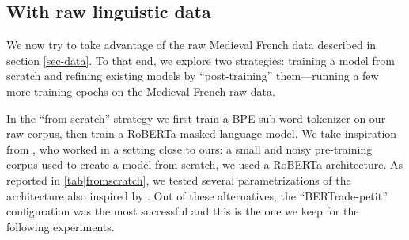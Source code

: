 \subsection{With raw linguistic data}\label{sec|withraw}

\begin{table}[ht]
    \centering
    \tablefontsize
    \caption{Results on SRCMF dev — Performances of different model sizes when training from scratch}\label{tab|fromscratch}
\end{table}

We now try to take advantage of the raw Medieval French data described in section \ref{sec-data}. To that end, we explore two strategies: training a model from scratch and refining existing models by \enquote{post-training} them---running a few more training epochs on the Medieval French raw data.

In the \enquote{from scratch} strategy we first train a BPE sub-word tokenizer \citep{wang-cho-etal-2020-neural} on our raw corpus, then train a RoBERTa \citep{liu-etal-2019-roberta} masked language model. We take inspiration from \citet{micheli-etal-2020-importance}, who worked in a setting close to ours: a small and noisy pre-training corpus used to create a model from scratch, we used a RoBERTa architecture. As reported in \cref{tab|fromscratch}, we tested several parametrizations of the architecture also inspired by \citet{turc-etal-2019-well}. Out of these alternatives, the \enquote{BERTrade-petit} configuration was the most successful and this is the one we keep for the following experiments.

